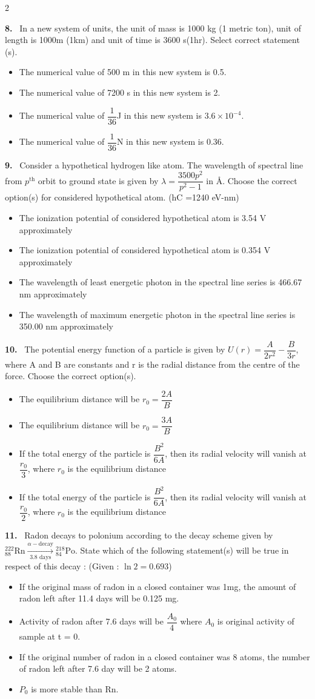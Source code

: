 \documentclass[10pt]{extarticle}
\newcommand{\qn}[1]{\par\smallskip\noindent\textbf{#1.}~}
\newenvironment{qoptions}{\begin{itemize}[leftmargin=1.8em,itemsep=1pt,topsep=2pt,label={}]}{\end{itemize}}
\newcommand{\opt}[2]{\item[(#1)] #2}
\begin{document}
\begin{multicols}{2}
\qn{8} In a new system of units, the unit of mass is 1000 kg (1 metric ton), unit of length is 1000m (1km) and unit of time is 3600 s(1hr). Select correct statement (s).
\begin{qoptions}
\opt{A}{The numerical value of 500 m in this new system is 0.5.}
\opt{B}{The numerical value of 7200 s in this new system is 2.}
\opt{C}{The numerical value of $\dfrac1{36}$J in this new system is $3.6\times10^{-4}$.}
\opt{D}{The numerical value of $\dfrac1{36}$N in this new system is 0.36.}
\end{qoptions}

\qn{9} Consider a hypothetical hydrogen like atom. The wavelength of spectral line from $p^{\text{th}}$ orbit to ground state is given by $\lambda=\dfrac{3500p^2}{p^2-1}$ in \AA. Choose the correct option(s) for considered hypothetical atom. (hC =1240 eV-nm)
\begin{qoptions}
\opt{A}{The ionization potential of considered hypothetical atom is 3.54 V approximately}
\opt{B}{The ionization potential of considered hypothetical atom is 0.354 V approximately}
\opt{C}{The wavelength of least energetic photon in the spectral line series is 466.67 nm approximately}
\opt{D}{The wavelength of maximum energetic photon in the spectral line series is 350.00 nm approximately}
\end{qoptions}

\qn{10} The potential energy function of a particle is given by $U(r)=\dfrac A{2r^2}-\dfrac B{3r}$, where A and B are constants and r is the radial distance from the centre of the force. Choose the correct option(s).
\begin{qoptions}
\opt{A}{The equilibrium distance will be $r_0=\dfrac{2A}B$}
\opt{B}{The equilibrium distance will be $r_0=\dfrac{3A}B$}
\opt{C}{If the total energy of the particle is $\dfrac{B^2}{6A}$, then its radial velocity will vanish at $\dfrac{r_0}3$, where $r_0$ is the equilibrium distance}
\opt{D}{If the total energy of the particle is $\dfrac{B^2}{6A}$, then its radial velocity will vanish at $\dfrac{r_0}2$, where $r_0$ is the equilibrium distance}
\end{qoptions}

\qn{11} Radon decays to polonium according to the decay scheme given by ${}^{222}_{88}\text{Rn}\xrightarrow[3.8\text{ days}]{\alpha-\text{decay}}{}^{218}_{84}\text{Po}$. State which of the following statement(s) will be true in respect of this decay : (Given : $\ln2=0.693$)
\begin{qoptions}
\opt{A}{If the original mass of radon in a closed container was 1mg, the amount of radon left after 11.4 days will be 0.125 mg.}
\opt{B}{Activity of radon after 7.6 days will be $\dfrac{A_0}4$ where $A_0$ is original activity of sample at t = 0.}
\opt{C}{If the original number of radon in a closed container was 8 atoms, the number of radon left after 7.6 day will be 2 atoms.}
\opt{D}{$P_0$ is more stable than Rn.}
\end{qoptions}


\end{multicols}
\end{document}
